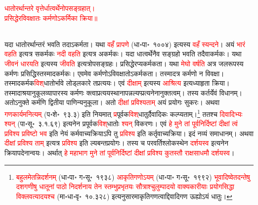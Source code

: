 \centering\textcolor{red}{धातोरर्थान्तरे वृत्तेर्धात्वर्थेनोपसङ्ग्रहात्।\nopagebreak\\
प्रसिद्धेरविवक्षातः कर्मणोऽकर्मिका क्रिया॥}\nopagebreak\\
\\
\begin{sloppypar}\justifying\noindent यदा धातोरर्थान्तरं भवति तदाऽकर्मता। यथा \textcolor{red}{वहँ प्रापणे} (धा॰पा॰~१००४) इत्यस्य \textcolor{red}{वहँ स्यन्दने}। अयं \textcolor{red}{भारं वहति} इत्यत्र सकर्मकः \textcolor{red}{नदी वहति} इत्यत्र अकर्मकः। यदा धात्वर्थेनैव सङ्ग्रहो भवति तदैवाकर्मकः। यथा \textcolor{red}{जीवनं धारयति} इत्यस्य \textcolor{red}{जीवति} इत्यत्रोपसङ्ग्रहः। प्रसिद्धेरप्यकर्मकता। यथा \textcolor{red}{मेघो वर्षति} अत्र जल\-रूपस्य कर्मणः प्रसिद्धिस्तस्मादकर्मकः। एवमेव कर्मणोऽविवक्षातोऽकर्मकता। तस्मादत्र कर्मणो न विवक्षा। तस्मादकर्मक\-\textcolor{red}{विश्‌}\-धातोर्भावे लोड्लकारे त\-प्रत्ययः। एवं \textcolor{red}{दीक्षाम्‌} इत्यस्य \textcolor{red}{आश्रित्य} इत्यध्याहृता क्रिया। तस्मादाश्रयानुकूल\-व्यापारस्य कर्मणः क्त्वा\-प्रत्यय\-स्थानापन्न\-ल्यप्प्रत्यनेनानुक्तत्वम्। तस्य कर्तर्येवं विधानम्। अतोऽनुक्ते कर्मणि द्वितीया पाणिन्यनुकूला। अतो \textcolor{red}{दीक्षां प्रविश्यताम्‌} अयं प्रयोगः सुकरः। अथवा \textcolor{red}{गण\-कार्यमनित्यम्‌} (प॰शे॰~९३.३) इति नियमात् \textcolor{red}{प्र}\-पूर्वक\-\textcolor{red}{विश्‌}\-धातुर्दैवादिकः कल्प्यताम्।\footnote{\textcolor{red}{बहुलमेतन्निदर्शनम्‌} (धा॰पा॰ ग॰सू॰~१९३८) \textcolor{red}{आकृतिगणोऽयम्‌} (धा॰पा॰ ग॰सू॰~१९९२) \textcolor{red}{भूवादिष्वेतदन्तेषु दशगणीषु धातूनां पाठो निदर्शनाय तेन स्तम्भुप्रभृतयः सौत्राश्चुलुम्पादयो वाक्यकारीयाः प्रयोगसिद्धा विक्लवत्यादयश्च} (मा॰धा॰वृ॰~१०.३२८) इत्यनुसारमाकृति\-गणत्वाद्दिवादि\-गण ऊह्योऽयं धातुः।} ततश्च \textcolor{red}{दिवादिभ्यः श्यन्‌} (पा॰सू॰~३.१.६९) इत्यनेन प्र\-पूर्वक\-\textcolor{red}{विश्‌}\-धातोः \textcolor{red}{श्यन्‌} विकरणः। एवं \textcolor{red}{हे मुने तां पूर्व\-निर्दिष्टां दीक्षां त्वं प्रविश्य प्रविष्टो भव} इति नेयं कर्म\-वाच्य\-क्रियाऽपि तु \textcolor{red}{प्रविश्य} इति कर्तृ\-वाच्य\-क्रिया। इदं नव्यं समाधानम्। अथवा \textcolor{red}{दीक्षां प्रविश्य ताम्‌} इत्यत्र \textcolor{red}{प्रविश्य} इति ल्यबन्त\-प्रयोगः। तस्य च परवर्ति\-श्लोकस्थेन \textcolor{red}{दर्शयस्व} इत्यनेन क्रिया\-पदेनान्वयः। अर्थात् \textcolor{red}{हे महाभाग मुने तां पूर्व\-निर्दिष्टां दीक्षां प्रविश्य कुतस्तौ राक्षसाधमौ दर्शयस्व}।\end{sloppypar}

